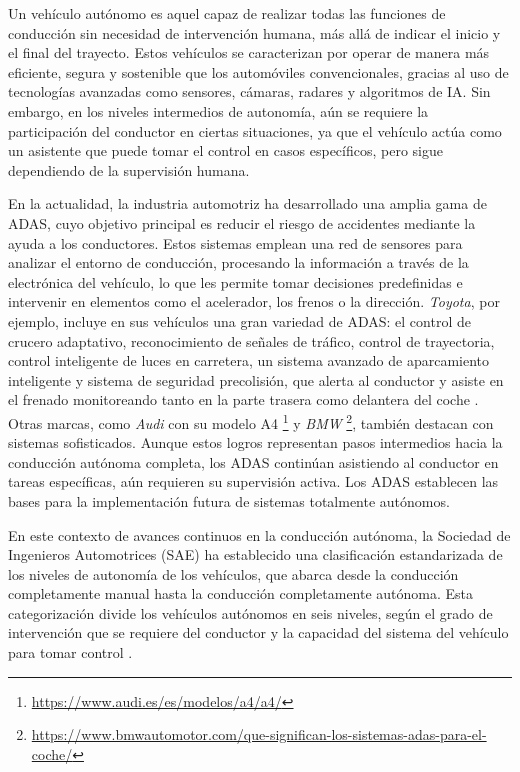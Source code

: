 Un vehículo autónomo es aquel capaz de realizar todas las funciones de conducción sin necesidad de intervención humana, más allá de indicar el inicio y el final del trayecto. Estos vehículos se caracterizan por operar de manera más eficiente, segura y sostenible que los automóviles convencionales, gracias al uso de tecnologías avanzadas como sensores, cámaras, radares y algoritmos de \ac{IA}. Sin embargo, en los niveles intermedios de autonomía, aún se requiere la participación del conductor en ciertas situaciones, ya que el vehículo actúa como un asistente que puede tomar el control en casos específicos, pero sigue dependiendo de la supervisión humana.

En la actualidad, la industria automotriz ha desarrollado una amplia gama de \ac{ADAS}, cuyo objetivo principal es reducir el riesgo de accidentes mediante la ayuda a los conductores. Estos sistemas emplean una red de sensores para analizar el entorno de conducción, procesando la información a través de la electrónica del vehículo, lo que les permite tomar decisiones predefinidas e intervenir en elementos como el acelerador, los frenos o la dirección. \textit{Toyota}, por ejemplo, incluye en sus vehículos una gran variedad de \ac{ADAS}: el control de crucero adaptativo, reconocimiento de señales de tráfico, control de trayectoria, control inteligente de luces en carretera, un sistema avanzado de aparcamiento inteligente y sistema de seguridad precolisión, que alerta al conductor y asiste en el frenado monitoreando tanto en la parte trasera como delantera del coche \cite{toyota-assist}. Otras marcas, como \textit{Audi} con su modelo A4 \footnote{\url{https://www.audi.es/es/modelos/a4/a4/}} y \textit{BMW} \footnote{\url{https://www.bmwautomotor.com/que-significan-los-sistemas-adas-para-el-coche/}}, también destacan con sistemas sofisticados. Aunque estos logros representan pasos intermedios hacia la conducción autónoma completa, los \ac{ADAS} continúan asistiendo al conductor en tareas específicas, aún requieren su supervisión activa. Los \ac{ADAS} establecen las bases para la implementación futura de sistemas totalmente autónomos. 

En este contexto de avances continuos en la conducción autónoma, la Sociedad de Ingenieros Automotrices (\ac{SAE}) ha establecido una clasificación estandarizada de los niveles de autonomía de los vehículos, que abarca desde la conducción completamente manual hasta la conducción completamente autónoma. Esta categorización divide los vehículos autónomos en seis niveles, según el grado de intervención que se requiere del conductor y la capacidad del sistema del vehículo para tomar control \cite{autobild-autonomous}.

